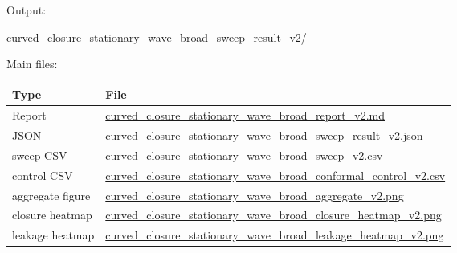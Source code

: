 \documentclass[
  a4paper,
]{article}
\newenvironment{Shaded}{}{}
\newcommand{\NormalTok}[1]{#1}
\newcounter{none} %
\begin{document}
Output:

\begin{Shaded}
\begin{Highlighting}[]
\NormalTok{curved\_closure\_stationary\_wave\_broad\_sweep\_result\_v2/}
\end{Highlighting}
\end{Shaded}

Main files:

{\def\LTcaptype{none} %
\begin{longtable}[]{@{}
  >{\raggedright\arraybackslash}p{}
  >{\raggedright\arraybackslash}p{}@{}}
\toprule\noalign{}
\begin{minipage}[b]{\linewidth}\raggedright
Type
\end{minipage} & \begin{minipage}[b]{\linewidth}\raggedright
File
\end{minipage} \\
\midrule\noalign{}
\endhead
\bottomrule\noalign{}
\endlastfoot
Report &
\href{curved_closure_stationary_wave_broad_sweep_result_v2/curved_closure_stationary_wave_broad_report_v2.md}{curved\_closure\_stationary\_wave\_broad\_report\_v2.md} \\
JSON &
\href{curved_closure_stationary_wave_broad_sweep_result_v2/curved_closure_stationary_wave_broad_sweep_result_v2.json}{curved\_closure\_stationary\_wave\_broad\_sweep\_result\_v2.json} \\
sweep CSV &
\href{curved_closure_stationary_wave_broad_sweep_result_v2/curved_closure_stationary_wave_broad_sweep_v2.csv}{curved\_closure\_stationary\_wave\_broad\_sweep\_v2.csv} \\
control CSV &
\href{curved_closure_stationary_wave_broad_sweep_result_v2/curved_closure_stationary_wave_broad_conformal_control_v2.csv}{curved\_closure\_stationary\_wave\_broad\_conformal\_control\_v2.csv} \\
aggregate figure &
\href{curved_closure_stationary_wave_broad_sweep_result_v2/curved_closure_stationary_wave_broad_aggregate_v2.png}{curved\_closure\_stationary\_wave\_broad\_aggregate\_v2.png} \\
closure heatmap &
\href{curved_closure_stationary_wave_broad_sweep_result_v2/curved_closure_stationary_wave_broad_closure_heatmap_v2.png}{curved\_closure\_stationary\_wave\_broad\_closure\_heatmap\_v2.png} \\
leakage heatmap &
\href{curved_closure_stationary_wave_broad_sweep_result_v2/curved_closure_stationary_wave_broad_leakage_heatmap_v2.png}{curved\_closure\_stationary\_wave\_broad\_leakage\_heatmap\_v2.png} \\
\end{longtable}
}
\end{document}
